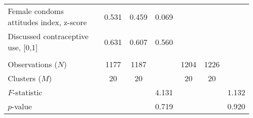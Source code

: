 \begin{table}
\begin{tabular}[t]{lcccccc}
\hspace{1em}Female condoms attitudes index, z-score & 0.531 & 0.459 & 0.069 &  &  & \\
\rowcolor{gray!6}  \hspace{1em}Discussed contraceptive use, [0,1] & 0.631 & 0.607 & 0.560 &  &  & \\
\addlinespace[0.3em]
\hline
\multicolumn{7}{l}{\textbf{}}\\
Observations ($N$) & 1177 & 1187 &  & 1204 & 1226 & \\
\rowcolor{gray!6}  Clusters ($M$) & 20 & 20 &  & 20 & 20 & \\
$F$-statistic &  &  & 4.131 &  &  & 1.132\\
\rowcolor{gray!6}  $p$-value &  &  & 0.719 &  &  & 0.920\\
\bottomrule
\end{tabular}
\end{table}
